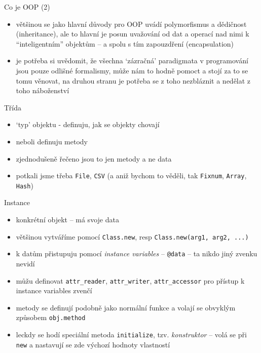 \documentclass{beamer}
\begin{document}
\begin{frame}{Co je OOP (2)}
  \begin{itemize}
    \item většinou se jako hlavní důvody pro OOP uvádí polymorfismus a dědičnost (inheritance), ale to hlavní je posun uvažování od dat a operací nad nimi k ``inteligentním'' objektům – a spolu s tím zapouzdření (encapsulation)
    \item je potřeba si uvědomit, že všechna `zázračná' paradigmata v programování jsou pouze odlišné formalismy, může nám to hodně pomoct a stojí za to se tomu věnovat, na druhou stranu je potřeba se z toho nezbláznit a nedělat z toho náboženství
  \end{itemize}
\end{frame}

\begin{frame}{Třída}
  \begin{itemize}
    \item `typ' objektu - definuju, jak se objekty chovají
    \item neboli definuju metody
    \item zjednodušeně řečeno jsou to jen metody a ne data
    \item potkali jsme třeba \texttt{File}, \texttt{CSV} (a aniž bychom to věděli, tak \texttt{Fixnum}, \texttt{Array}, \texttt{Hash})
  \end{itemize}
\end{frame}

\begin{frame}[containsverbatim]{Instance}
  \begin{itemize}
    \item konkrétní objekt – má svoje data
    \item většinou vytváříme pomocí \texttt{Class.new}, resp \texttt{Class.new(arg1, arg2, ...)}
    \item k datům přistupuju pomocí \emph{instance variables} -- \verb|@data| -- ta nikdo jiný zvenku nevidí
    \item můžu definovat \texttt{attr\_reader}, \texttt{attr\_writer}, \texttt{attr\_accessor} pro přístup k instance variables zvenčí
    \item metody se definují podobně jako normální funkce a volají se obvyklým způsobem \texttt{obj.method}
    \item leckdy se hodí speciální metoda \texttt{initialize}, tzv. \emph{konstruktor} -- volá se při \texttt{new} a nastavují se zde výchozí hodnoty vlastností
  \end{itemize}
\end{frame}
\end{document}
